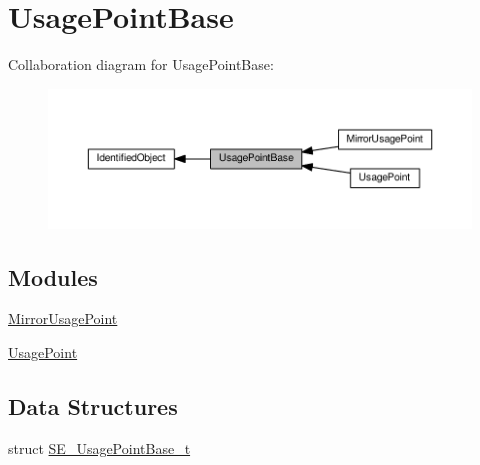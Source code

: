 \hypertarget{group__UsagePointBase}{}\section{Usage\+Point\+Base}
\label{group__UsagePointBase}
Collaboration diagram for Usage\+Point\+Base\+:\nopagebreak
\begin{figure}[H]
\begin{center}
\leavevmode
\includegraphics[width=350pt]{group__UsagePointBase}
\end{center}
\end{figure}
\subsection*{Modules}
\begin{DoxyCompactItemize}
\item 
\hyperlink{group__MirrorUsagePoint}{Mirror\+Usage\+Point}
\item 
\hyperlink{group__UsagePoint}{Usage\+Point}
\end{DoxyCompactItemize}
\subsection*{Data Structures}
\begin{DoxyCompactItemize}
\item 
struct \hyperlink{structSE__UsagePointBase__t}{S\+E\+\_\+\+Usage\+Point\+Base\+\_\+t}
\end{DoxyCompactItemize}
